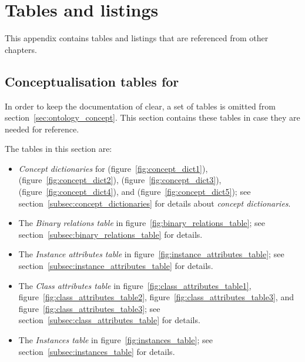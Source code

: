 \chapter{Tables and listings}
\label{ch:listings}

This appendix contains tables and listings that are referenced from other chapters.

\section{Conceptualisation tables for \thinkhomeweather}
\label{sec:appendix_conceptualisation}

In order to keep the documentation of \thinkhomeweather clear, a set of tables is omitted from section~\ref{sec:ontology_concept}. This section contains these tables in case they are needed for reference.

The tables in this section are:

\begin{itemize}
  \item \emph{Concept dictionaries} for  (figure~\ref{fig:concept_dict1}),  (figure~\ref{fig:concept_dict2}),  (figure~\ref{fig:concept_dict3}),  (figure~\ref{fig:concept_dict4}), and  (figure~\ref{fig:concept_dict5}); see section~\ref{subsec:concept_dictionaries} for details about \emph{concept dictionaries}.
  
  \item The \emph{Binary relations table} in figure~\ref{fig:binary_relations_table}; see section~\ref{subsec:binary_relations_table} for details.
  
  \item The \emph{Instance attributes table} in figure~\ref{fig:instance_attributes_table}; see section~\ref{subsec:instance_attributes_table} for details.
  
  \item The \emph{Class attributes table} in figure~\ref{fig:class_attributes_table1}, figure~\ref{fig:class_attributes_table2}, figure~\ref{fig:class_attributes_table3}, and figure~\ref{fig:class_attributes_table3}; see section~\ref{subsec:class_attributes_table} for details.
  
  \item The \emph{Instances table} in figure~\ref{fig:instances_table}; see section~\ref{subsec:instances_table} for details.
\end{itemize}

